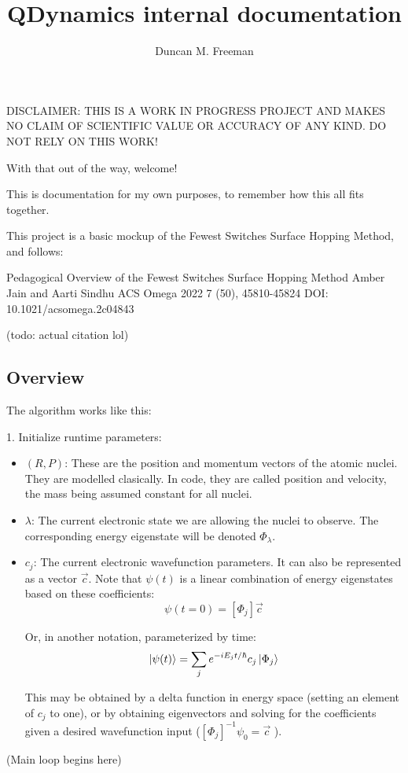 \documentclass[12pt]{article}
\title{QDynamics internal documentation}
\author{Duncan M. Freeman}
\newcommand{\eigbasis}[0]{[\Phi_j]}
\begin{document}
\maketitle
DISCLAIMER: THIS IS A WORK IN PROGRESS PROJECT AND MAKES NO CLAIM OF SCIENTIFIC VALUE OR ACCURACY OF ANY KIND. DO NOT RELY ON THIS WORK!

With that out of the way, welcome!

This is documentation for my own purposes, to remember how this all fits together.

This project is a basic mockup of the Fewest Switches Surface Hopping
Method, and follows:

Pedagogical Overview of the Fewest Switches Surface Hopping Method
Amber Jain and Aarti Sindhu
ACS Omega 2022 7 (50), 45810-45824
DOI: 10.1021/acsomega.2c04843

(todo: actual citation lol)
\clearpage

\subsection{Overview}
The algorithm works like this:

1. Initialize runtime parameters:
\begin{itemize}
    \item $(R, P)$: These are the position and momentum vectors of the atomic nuclei. They are modelled clasically. In code, they are called position and velocity, the mass being assumed constant for all nuclei.
    \item $\lambda$: The current electronic state we are allowing the nuclei to observe. The corresponding energy eigenstate will be denoted $\Phi_\lambda$.
    \item $c_j$: The current electronic wavefunction parameters. It can also be represented as a vector $\vec{c}$. Note that $\psi(t)$ is a linear combination of energy eigenstates based on these coefficients: 
        \[ \psi(t=0) = \eigbasis \vec{c} \]

        Or, in another notation, parameterized by time:
        \[ \ket{\psi(t)} = \sum_j e^{-iE_jt/\hbar} c_j \ket{\Phi_j} \]

        This may be obtained by a delta function in energy space (setting an element of $c_j$ to one), or by obtaining eigenvectors and solving for the coefficients given a desired wavefunction input ($\eigbasis^{-1} \psi_0 = \vec{c}$ ).
\end{itemize}

(Main loop begins here)
\end{document}
